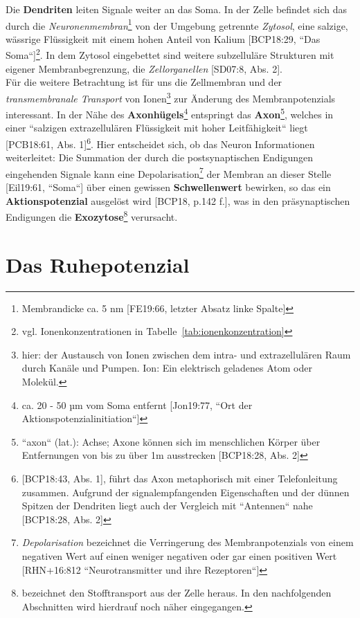 Die \textbf{Dendriten} leiten Signale weiter an das Soma.
In der Zelle befindet sich das durch die \textit{Neuronenmembran}\footnote{
 Membrandicke ca. 5 nm {[FE19:66, letzter Absatz linke Spalte]}
} von der Umgebung getrennte \textit{Zytosol}, eine salzige, wässrige Flüssigkeit mit einem hohen Anteil von Kalium [BCP18:29, ``Das Soma``]\footnote{
 vgl. Ionenkonzentrationen in Tabelle~\ref{tab:ionenkonzentration}
}.
In dem Zytosol eingebettet sind weitere subzelluläre Strukturen mit eigener Membranbegrenzung, die \textit{Zellorganellen} [SD07:8, Abs. 2].\\
Für die weitere Betrachtung ist für uns die Zellmembran und der \textit{transmembranale Transport} von Ionen\footnote{
 hier: der Austausch von Ionen zwischen dem intra- und extrazellulären Raum durch Kanäle und Pumpen. Ion: Ein elektrisch geladenes Atom oder Molekül.
} zur Änderung des Membranpotenzials interessant. In der Nähe des \textbf{Axonhügels}\footnote{
 ca. 20 - 50 µm vom Soma entfernt [Jon19:77, ``Ort der Aktionspotenzialinitiation``]
} entspringt das \textbf{Axon}\footnote{
 ``axon`` (lat.): Achse; Axone können sich im menschlichen Körper über Entfernungen von bis zu über 1m ausstrecken {[BCP18:28, Abs. 2]}
}, welches in einer ``salzigen extrazellulären Flüssigkeit mit hoher Leitfähigkeit`` liegt [PCB18:61, Abs. 1]\footnote{
  {[BCP18:43, Abs. 1]}, führt das Axon metaphorisch mit einer Telefonleitung zusammen. Aufgrund der signalempfangenden Eigenschaften und der dünnen Spitzen der Dendriten liegt auch der Vergleich mit ``Antennen`` nahe {[BCP18:28, Abs. 2]}
}.
Hier entscheidet sich, ob das Neuron Informationen weiterleitet: Die Summation der durch die postsynaptischen Endigungen eingehenden Signale kann eine Depolarisation\footnote{
  \textit{Depolarisation} bezeichnet die Verringerung des Membranpotenzials von einem negativen Wert auf einen weniger negativen oder gar einen positiven Wert {[RHN+16:812 ``Neurotransmitter und ihre Rezeptoren``]}
} der Membran an dieser Stelle [Eil19:61, ``Soma``] über einen gewissen \textbf{Schwellenwert} bewirken, so das ein \textbf{Aktionspotenzial} ausgelöst wird [BCP18, p.142 f.], was in den präsynaptischen Endigungen die \textbf{Exozytose}\footnote{
  bezeichnet den Stofftransport aus der Zelle heraus. In den nachfolgenden Abschnitten wird hierdrauf noch näher eingegangen.
} verursacht.


\section{Das Ruhepotenzial}

